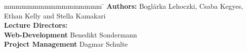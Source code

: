 \begin{titlepage}
\begin{center}
	\end{center}
	\vspace*{30mm}
	\begin{spacing}{1}
		\begin{tabbing}
				mmmmmmmmmmmmmmmmm     \= \kill
				\textbf{Authors:} \>  Boglárka Lehoczki, Csaba Kegyes,
				\\                  \> Ethan Kelly and Stella Kamakari\\
				\textbf{Lecture Directors:} \> \\
				\textbf{Web-Development}      \>  Benedikt Sondermann\\
				\textbf{Project Management}              \> Dagmar Schulte\\
		\end{tabbing}
	\end{spacing}
\end{titlepage}
